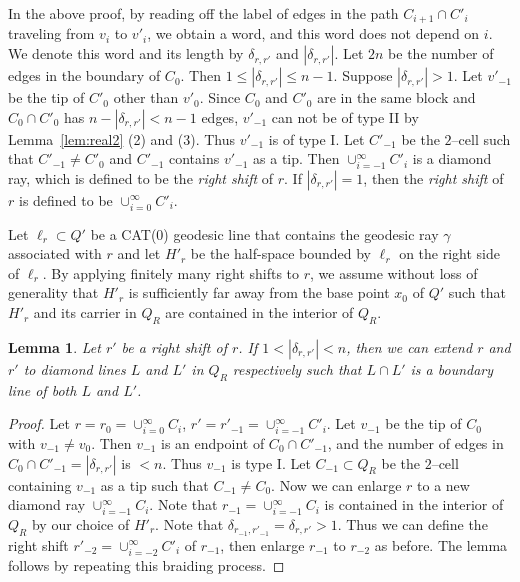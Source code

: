 \documentclass[11pt]{amsart}
\newtheorem{lemma}[theorem]{Lemma}
\theoremstyle{definition}
\begin{document}
In the above proof, by reading off the label of edges in the path $C_{i+1}\cap C'_i$ traveling from $v_i$ to $v'_i$, we obtain a word, and this word does not depend on $i$. We denote this word and its length by $\delta_{r,r'}$ and $|\delta_{r,r'}|$. Let $2n$ be the number of edges in the boundary of $C_0$. Then $1\le |\delta_{r,r'}|\le n-1$. Suppose $|\delta_{r,r'}|>1$. Let $v'_{-1}$ be the tip of $C'_0$ other than $v'_0$. Since $C_0$ and $C'_0$ are in the same block and $C_0\cap C'_0$ has $n-|\delta_{r,r'}|<n-1$ edges, $v'_{-1}$ can not be of type II by Lemma~\ref{lem:real2} (2) and (3). Thus $v'_{-1}$ is of type I. Let $C'_{-1}$ be the $2$--cell such that $C'_{-1}\neq C'_0$ and $C'_{-1}$ contains $v'_{-1}$ as a tip. Then $\cup_{i=-1}^{\infty}C'_i$ is a diamond ray, which is defined to be the \emph{right shift} of $r$. If $|\delta_{r,r'}|=1$, then the \emph{right shift} of $r$ is defined to be $\cup_{i=0}^{\infty}C'_i$. 

Let $\ell_r\subset Q'$ be a CAT(0) geodesic line that contains the geodesic ray $\gamma$ associated with $r$ and let $H'_r$ be the half-space bounded by $\ell_r$ on the right side of $\ell_r$. By applying finitely many right shifts to $r$, we assume without loss of generality that $H'_r$ is sufficiently far away from the base point $x_0$ of $Q'$ such that $H'_r$ and its carrier in $Q_R$ are contained in the interior of $Q_R$.

\begin{lemma}
	\label{lem:extend to diamond line1}
	Let $r'$ be a right shift of $r$. If $1<|\delta_{r,r'}|<n$, then we can extend $r$ and $r'$ to diamond lines $L$ and $L'$ in $Q_R$ respectively such that $L\cap L'$ is a boundary line of both $L$ and $L'$.
\end{lemma}

\begin{proof}
	Let $r=r_0=\cup_{i=0}^{\infty} C_i$, $r'=r'_{-1}=\cup_{i=-1}^{\infty} C'_i$. Let $v_{-1}$ be the tip of $C_0$ with $v_{-1}\neq v_0$. Then $v_{-1}$ is an endpoint of $C_0\cap C'_{-1}$, and the number of edges in $C_0\cap C'_{-1}=|\delta_{r,r'}|$ is $<n$. Thus $v_{-1}$ is type I. Let $C_{-1}\subset Q_R$ be the $2$--cell containing $v_{-1}$ as a tip such that $C_{-1}\neq C_0$. Now we can enlarge $r$ to a new diamond ray $\cup_{i=-1}^{\infty} C_i$. Note that $r_{-1}=\cup_{i=-1}^{\infty} C_i$ is contained in the interior of $Q_R$ by our choice of $H'_r$. Note that $\delta_{r_{-1},r'_{-1}}=\delta_{r,r'}>1$. Thus we can define the right shift $r'_{-2}=\cup_{i=-2}^{\infty} C'_i$ of $r_{-1}$, then enlarge $r_{-1}$ to $r_{-2}$ as before. The lemma follows by repeating this braiding process.
\end{proof}
\end{document}
